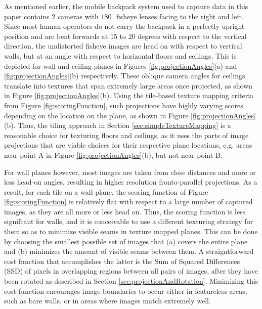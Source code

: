 \documentclass[10pt,twocolumn,letterpaper]{article}
\begin{document}
As mentioned earlier, the mobile backpack system used to capture data
in this paper contains 2 cameras with $180^\circ$ fisheye lenses
facing to the right and left. Since most human operators do not carry
the backpack in a perfectly upright position and are bent forwards at
15 to 20 degrees with respect to the vertical direction, the
undistorted fisheye images are head on with respect to vertical walls,
but at an angle with respect to horizontal floors and ceilings. This
is depicted for wall and ceiling planes in Figures
\ref{fig:projectionAngles}(a) and \ref{fig:projectionAngles}(b)
respectively. These oblique camera angles for ceilings translate into
textures that span extremely large areas once projected, as shown in
Figure \ref{fig:projectionAngles}(b). Using the tile-based texture
mapping criteria from Figure \ref{fig:scoringFunction}, such
projections have highly varying scores depending on the location on
the plane, as shown in Figure \ref{fig:projectionAngles}(b). Thus, the
tiling approach in Section \ref{sec:simpleTextureMapping} is a reasonable
choice for texturing floors and ceilings, as it uses the parts of
image projections that are viable choices for their respective plane
locations, e.g. areas near point A in Figure
\ref{fig:projectionAngles}(b), but not near point B.

For wall planes however, most images are taken from close distances
and more or less head-on angles, resulting in higher resolution
fronto-parallel projections. As a result, for each tile on a wall
plane, the scoring function of Figure \ref{fig:scoringFunction} is
relatively flat with respect to a large number of captured images, as
they are all more or less head on. Thus, the scoring function is less
signifcant for walls, and it is conceivable to use a different
texturing strategy for them so as to minimize visible seams in texture
mapped planes. This can be done by choosing the smallest possible set
of images that (a) covers the entire plane and (b) minimizes the
amount of visible seams between them. A straigntforward cost function
that accomplishes the latter is the Sum of Squared Differences (SSD)
of pixels in overlapping regions between all pairs of images, after
they have been rotated as described in Section
\ref{sec:projectionAndRotation}. Minimizing this cost function
encourages image boundaries to occur either in featureless areas, such
as bare walls, or in areas where images match extremely well.
\end{document}
